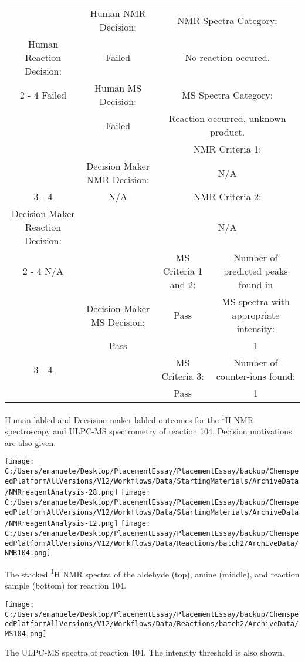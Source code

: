 \documentclass{article}%
\begin{document}
\begin{Decision Table}[H]%
\begin{tabular}{|c|c|c|c|}%
\hline%
&Human NMR Decision:&\multicolumn{2}{|c|}{NMR Spectra Category:}\\%
Human Reaction Decision:&Failed&\multicolumn{2}{|c|}{No reaction occured.}\\%
\cline{2%
-%
4}%
Failed&Human MS Decision:&\multicolumn{2}{|c|}{MS Spectra Category:}\\%
&Failed&\multicolumn{2}{|c|}{Reaction occurred, unknown product.}\\%
\hline%
&&\multicolumn{2}{|c|}{NMR Criteria 1:}\\%
&Decision Maker NMR Decision:&\multicolumn{2}{|c|}{N/A}\\%
\cline{3%
-%
4}%
&N/A&\multicolumn{2}{|c|}{NMR Criteria 2:}\\%
Decision Maker Reaction Decision:&&\multicolumn{2}{|c|}{N/A}\\%
\cline{2%
-%
4}%
N/A&&MS Criteria 1 and 2:&Number of predicted peaks found in\\%
&Decision Maker MS Decision:&Pass&MS spectra with appropriate intensity:\\%
&Pass&&1\\%
\cline{3%
-%
4}%
&&MS Criteria 3:&Number of counter{-}ions found:\\%
&&Pass&1\\%
\hline%
\end{tabular}%
\caption{Human labled and Decsision maker labled outcomes for the \textsuperscript{1}H NMR spectroscopy and ULPC-MS spectrometry of reaction 104. Decision motivations are also given.}%
\end{Decision Table}%
\begin{NMR Spectra}[H]%
\begin{center}%
\texttt{[image: C:/Users/emanuele/Desktop/PlacementEssay/PlacementEssay/backup/ChemspeedPlatformAllVersions/V12/Workflows/Data/StartingMaterials/ArchiveData/NMRreagentAnalysis-28.png]}\hfill%
\texttt{[image: C:/Users/emanuele/Desktop/PlacementEssay/PlacementEssay/backup/ChemspeedPlatformAllVersions/V12/Workflows/Data/StartingMaterials/ArchiveData/NMRreagentAnalysis-12.png]}\hfill%
\texttt{[image: C:/Users/emanuele/Desktop/PlacementEssay/PlacementEssay/backup/ChemspeedPlatformAllVersions/V12/Workflows/Data/Reactions/batch2/ArchiveData/NMR104.png]}\hfill%
\end{center}%
\caption{The stacked \textsuperscript{1}H NMR spectra of the aldehyde (top), amine (middle), and reaction sample (bottom) for reaction 104.}%
\end{NMR Spectra}%
\begin{MS Spectra}[H]%
\begin{center}%
\texttt{[image: C:/Users/emanuele/Desktop/PlacementEssay/PlacementEssay/backup/ChemspeedPlatformAllVersions/V12/Workflows/Data/Reactions/batch2/ArchiveData/MS104.png]}\hfill%
\end{center}%
\caption{The ULPC-MS spectra of reaction 104. The intensity threshold is also shown.}%
\end{MS Spectra}%
\end{document}
